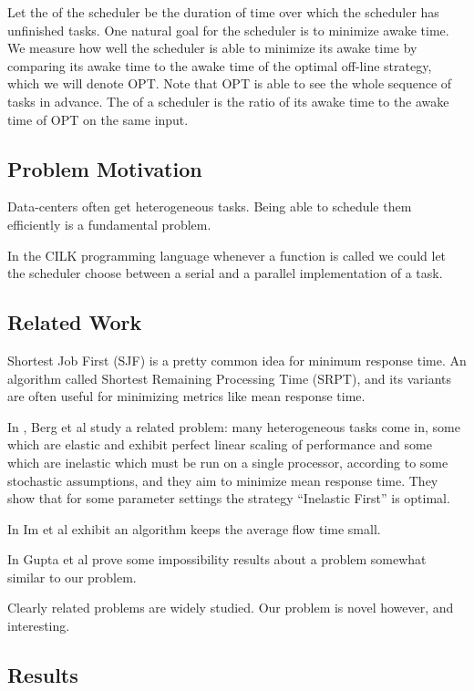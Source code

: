 Let the  of the scheduler be the duration of
time over which the scheduler has unfinished tasks. One natural
goal for the scheduler is to minimize awake time. We measure how
well the scheduler is able to minimize its awake time by
comparing its awake time to the awake time of the optimal
off-line strategy, which we will denote OPT. Note that OPT is
able to see the whole sequence of tasks in advance. The
 of a scheduler is the ratio of its awake
time to the awake time of OPT on the same input.


\subsection{Problem Motivation}
Data-centers often get heterogeneous tasks. Being able to schedule
them efficiently is a fundamental problem. 

In the CILK programming language whenever a function is called we
could let the scheduler choose between a serial and a parallel
implementation of a task. 

\subsection{Related Work}
Shortest Job First (SJF) is a pretty common idea for minimum response time. 
An algorithm called Shortest Remaining Processing Time (SRPT),
and its variants are often useful for minimizing metrics like mean
response time.

In \cite{bb20}, Berg et al study a related problem:
many heterogeneous tasks come in, some which are elastic and
exhibit perfect linear scaling of performance and some which are
inelastic which must be run on a single processor, according to
some stochastic assumptions, and they aim to minimize mean
response time. They show that for some parameter settings the
strategy \enquote{Inelastic First} is optimal.

In \cite{is16} Im et al exhibit an algorithm keeps the average
flow time small. 

In \cite{ga12} Gupta et al prove some impossibility results about
a problem somewhat similar to our problem.

Clearly related problems are widely studied.
Our problem is novel however, and interesting.

\subsection{Results}
